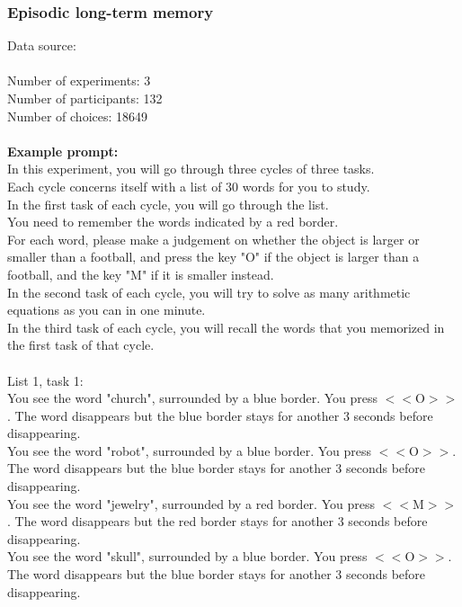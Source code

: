 \documentclass[pdflatex,sn-nature]{sn-jnl}%
\theoremstyle{thmstyleone}%
\theoremstyle{thmstyletwo}%
\theoremstyle{thmstylethree}%
\begin{document}
\subsubsection*{Episodic long-term memory}
Data source: \cite{popov2023intent} \\ $~$ \\
Number of experiments: 3 $~$\\ 
Number of participants: 132 $~$\\ 
Number of choices: 18649 $~$\\ 
 $~$\\ 
\textbf{Example prompt:}
 $~$\\ 
In this experiment, you will go through three cycles of three tasks. $~$\\ 
Each cycle concerns itself with a list of 30 words for you to study. $~$\\ 
In the first task of each cycle, you will go through the list. $~$\\ 
You need to remember the words indicated by a red border. $~$\\ 
For each word, please make a judgement on whether the object is larger or smaller than a football, and press the key "O" if the object is larger than a football, and the key "M" if it is smaller instead. $~$\\ 
In the second task of each cycle, you will try to solve as many arithmetic equations as you can in one minute. $~$\\ 
In the third task of each cycle, you will recall the words that you memorized in the first task of that cycle. $~$\\ 
 $~$\\ 
List 1, task 1:  $~$\\ 
You see the word "church", surrounded by a blue border. You press $<<$O$>>$. The word disappears but the blue border stays for another 3 seconds before disappearing. $~$\\ 
You see the word "robot", surrounded by a blue border. You press $<<$O$>>$. The word disappears but the blue border stays for another 3 seconds before disappearing. $~$\\ 
You see the word "jewelry", surrounded by a red border. You press $<<$M$>>$. The word disappears but the red border stays for another 3 seconds before disappearing. $~$\\ 
You see the word "skull", surrounded by a blue border. You press $<<$O$>>$. The word disappears but the blue border stays for another 3 seconds before disappearing. $~$\\ 
\end{document}
